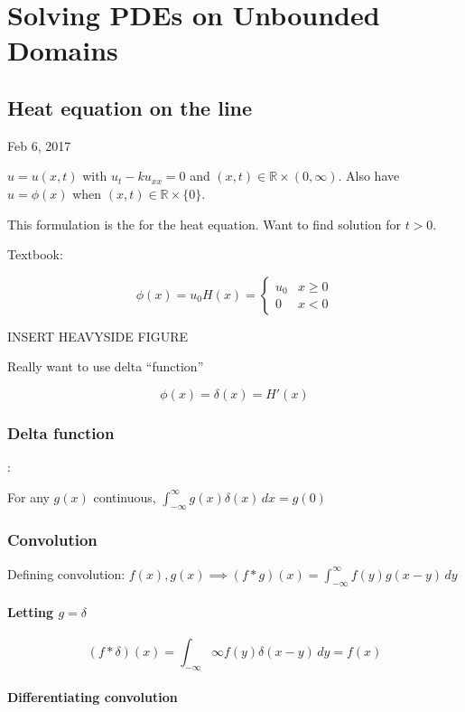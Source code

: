 \documentclass[main.tex]{subfiles}
\begin{document}
\section{Solving PDEs on Unbounded Domains}

\subsection{Heat equation on the line}

Feb 6, 2017

\vspace{3mm}

$u = u(x, t)$ with $u_t - ku_{xx} = 0$ and $(x, t) \in \mathbb{R} \times (0, \infty)$. Also have $u = \phi(x)$ when $(x, t) \in \mathbb{R} \times \{0\}$.

This formulation is the  for the heat equation. Want to find solution for $t > 0$.

Textbook:

$$\phi(x) = u_0H(x) = \begin{cases}u_0 & x \ge 0 \\ 0 & x < 0\end{cases}$$

INSERT HEAVYSIDE FIGURE


Really want to use delta ``function''

$$\phi(x) = \delta(x) = H'(x)$$

\subsubsection{Delta function}:

For any $g(x)$ continuous, $\int_{-\infty}^{\infty} g(x) \delta(x)\,dx = g(0)$
\subsubsection{Convolution}
Defining convolution: $f(x), g(x) \implies (f * g)(x) = \int_{-\infty}^{\infty} f(y) g(x - y)\,dy$

\paragraph{Letting $g = \delta$}

$$(f * \delta)(x) = \int_{-\infty}{\infty} f(y)\delta(x - y)\, dy = f(x)$$

\paragraph{Differentiating convolution}
\end{document}
